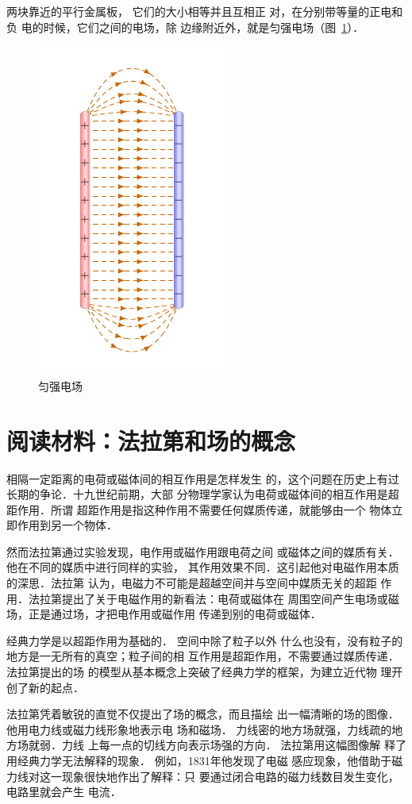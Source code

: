 两块靠近的平行金属板，
它们的大小相等并且互相正
对，在分别带等量的正电和负
电的时候，它们之间的电场，除
边缘附近外，就是匀强电场（图~\ref{fig_B_6-11}）．

\begin{figure}[htbp]
    \centering
    \includegraphics{fig/B/6-11.pdf}
    \caption{匀强电场}\label{fig_B_6-11}
\end{figure}

\section*{阅读材料：法拉第和场的概念}
相隔一定距离的电荷或磁体间的相互作用是怎样发生
的，这个问题在历史上有过长期的争论．十九世纪前期，大部
分物理学家认为电荷或磁体间的相互作用是超距作用．所谓
超距作用是指这种作用不需要任何媒质传递，就能够由一个
物体立即作用到另一个物体．

然而法拉第通过实验发现，电作用或磁作用跟电荷之间
或磁体之间的媒质有关．他在不同的媒质中进行同样的实验，
其作用效果不同．这引起他对电磁作用本质的深思．法拉第
认为，电磁力不可能是超越空间并与空间中媒质无关的超距
作用．法拉第提出了关于电磁作用的新看法：电荷或磁体在
周围空间产生电场或磁场，正是通过场，才把电作用或磁作用
传递到别的电荷或磁体．

经典力学是以超距作用为基础的．
空间中除了粒子以外
什么也没有，没有粒子的地方是一无所有的真空；粒子间的相
互作用是超距作用，不需要通过媒质传递．法拉第提出的场
的模型从基本概念上突破了经典力学的框架，为建立近代物
理开创了新的起点．

法拉第凭着敏锐的直觉不仅提出了场的概念，而且描绘
出一幅清晰的场的图像．他用电力线或磁力线形象地表示电
场和磁场．
力线密的地方场就强，力线疏的地方场就弱．力线
上每一点的切线方向表示场强的方向．
法拉第用这幅图像解
释了用经典力学无法解释的现象．
例如，1831年他发现了电磁
感应现象，他借助于磁力线对这一现象很快地作出了解释：只
要通过闭合电路的磁力线数目发生变化，电路里就会产生
电流．

